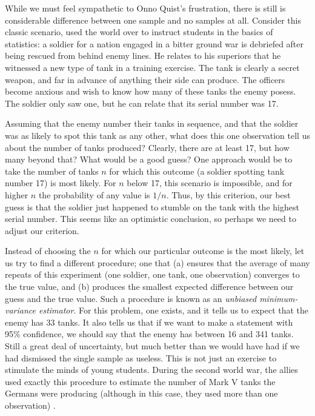  \index{$5\sigma$} 

While we must feel sympathetic to Onno Quist's frustration, there is still is considerable difference between one sample and no samples at all. Consider this classic scenario, used the world over to instruct students in the basics of statistics: a soldier for a nation engaged in a bitter ground war is debriefed after being rescued from behind enemy lines. He relates to his superiors that he witnessed a new type of tank in a training exercise. The tank is clearly a secret weapon, and far in advance of anything their side can produce. The officers become anxious and wish to know how many of these tanks the enemy posess. The soldier only saw one, but he can relate that its serial number was 17.


Assuming that the enemy number their tanks in sequence, and that the soldier was as likely to spot this tank as any other, what does this one observation tell us about the number of tanks produced? Clearly, there are at least 17, but how many beyond that? What would be a good guess? One approach would be to take the number of tanks $n$ for which this outcome (a soldier spotting tank number 17) is most likely. For $n$ below 17, this scenario is impossible, and for higher $n$ the probability of any value is $1/n$. Thus, by this criterion, our best guess is that the soldier just happened to stumble on the tank with the highest serial number. This seems like an optimistic conclusion, so perhaps we need to adjust our criterion.

Instead of choosing the $n$ for which our particular outcome is the most likely, let us try to find a different procedure; one that (a) ensures that the average of many repeats of this experiment (one soldier, one tank, one observation) converges to the true value, and (b) produces the smallest expected difference between our guess and the true value. Such a procedure is known as an \emph{unbiased minimum-variance estimator}. For this problem, one exists, and it tells us to expect that the enemy has 33 tanks. It also tells us that if we want to make a statement with 95\% confidence, we should say that the enemy has between 16 and 341 tanks. Still a great deal of uncertainty, but much better than we would have had if we had dismissed the single sample as useless. This is not just an exercise to stimulate the minds of young students. During the second world war, the allies used exactly this procedure to estimate the number of Mark V tanks the Germans were producing (although in this case, they used more than one observation) \cite{davies2006statistical}.

